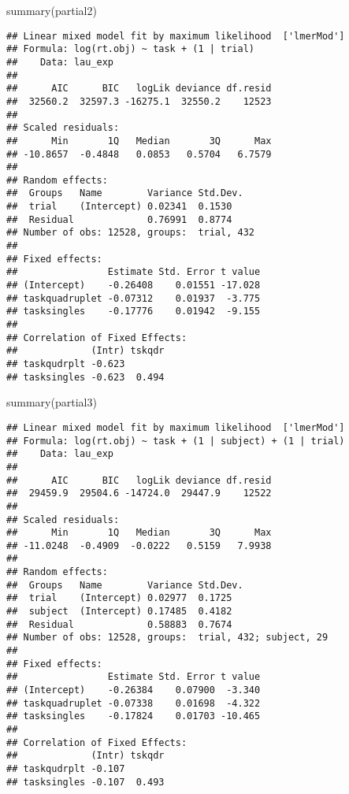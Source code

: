 \documentclass[
]{article}
\newenvironment{Shaded}{\begin{snugshade}}{\end{snugshade}}
\newcommand{\FunctionTok}[1]{\textcolor[rgb]{0.00,0.00,0.00}{#1}}
\newcommand{\NormalTok}[1]{#1}
\begin{document}
\begin{Shaded}
\begin{Highlighting}[]
\FunctionTok{summary}\NormalTok{(partial2)}
\end{Highlighting}
\end{Shaded}

\begin{verbatim}
## Linear mixed model fit by maximum likelihood  ['lmerMod']
## Formula: log(rt.obj) ~ task + (1 | trial)
##    Data: lau_exp
## 
##      AIC      BIC   logLik deviance df.resid 
##  32560.2  32597.3 -16275.1  32550.2    12523 
## 
## Scaled residuals: 
##      Min       1Q   Median       3Q      Max 
## -10.8657  -0.4848   0.0853   0.5704   6.7579 
## 
## Random effects:
##  Groups   Name        Variance Std.Dev.
##  trial    (Intercept) 0.02341  0.1530  
##  Residual             0.76991  0.8774  
## Number of obs: 12528, groups:  trial, 432
## 
## Fixed effects:
##                Estimate Std. Error t value
## (Intercept)    -0.26408    0.01551 -17.028
## taskquadruplet -0.07312    0.01937  -3.775
## tasksingles    -0.17776    0.01942  -9.155
## 
## Correlation of Fixed Effects:
##             (Intr) tskqdr
## taskqudrplt -0.623       
## tasksingles -0.623  0.494
\end{verbatim}

\begin{Shaded}
\begin{Highlighting}[]
\FunctionTok{summary}\NormalTok{(partial3)}
\end{Highlighting}
\end{Shaded}

\begin{verbatim}
## Linear mixed model fit by maximum likelihood  ['lmerMod']
## Formula: log(rt.obj) ~ task + (1 | subject) + (1 | trial)
##    Data: lau_exp
## 
##      AIC      BIC   logLik deviance df.resid 
##  29459.9  29504.6 -14724.0  29447.9    12522 
## 
## Scaled residuals: 
##      Min       1Q   Median       3Q      Max 
## -11.0248  -0.4909  -0.0222   0.5159   7.9938 
## 
## Random effects:
##  Groups   Name        Variance Std.Dev.
##  trial    (Intercept) 0.02977  0.1725  
##  subject  (Intercept) 0.17485  0.4182  
##  Residual             0.58883  0.7674  
## Number of obs: 12528, groups:  trial, 432; subject, 29
## 
## Fixed effects:
##                Estimate Std. Error t value
## (Intercept)    -0.26384    0.07900  -3.340
## taskquadruplet -0.07338    0.01698  -4.322
## tasksingles    -0.17824    0.01703 -10.465
## 
## Correlation of Fixed Effects:
##             (Intr) tskqdr
## taskqudrplt -0.107       
## tasksingles -0.107  0.493
\end{verbatim}
\end{document}
